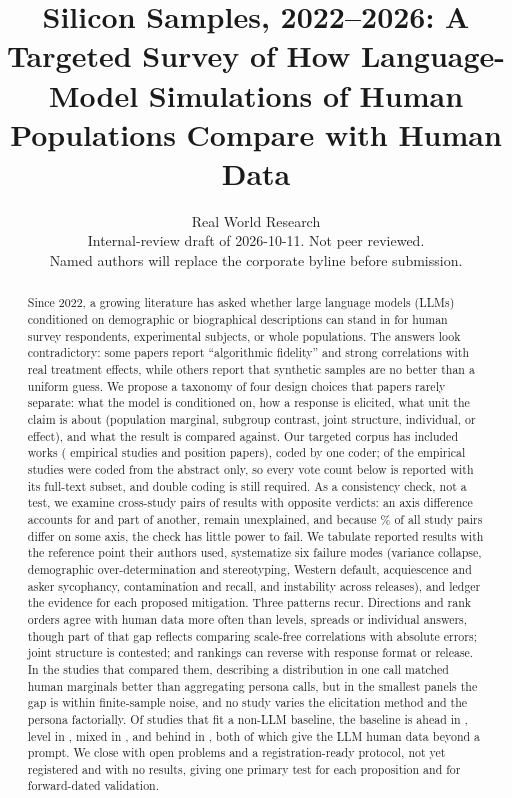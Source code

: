\documentclass[11pt]{article}
\title{Silicon Samples, 2022--2026: A Targeted Survey of How Language-Model Simulations of Human Populations Compare with Human Data}
\author{Real World Research\\\small Internal-review draft of 2026-10-11. Not peer reviewed.\\\small Named authors will replace the corporate byline before submission.}
\date{}
\begin{document}
\maketitle

\begin{abstract}
Since 2022, a growing literature has asked whether large language models (LLMs) conditioned on demographic or biographical descriptions can stand in for human survey respondents, experimental subjects, or whole populations. The answers look contradictory: some papers report ``algorithmic fidelity'' and strong correlations with real treatment effects, while others report that synthetic samples are no better than a uniform guess. We propose a taxonomy of four design choices that papers rarely separate: what the model is conditioned on, how a response is elicited, what unit the claim is about (population marginal, subgroup contrast, joint structure, individual, or effect), and what the result is compared against. Our targeted corpus has \cIncluded{} included works (\cEmp{} empirical studies and \cPos{} position papers), coded by one coder; \cEmpAbstract{} of the \cEmp{} empirical studies were coded from the abstract only, so every vote count below is reported with its full-text subset, and double coding is still required. As a consistency check, not a test, we examine \cConflicts{} cross-study pairs of results with opposite verdicts: an axis difference accounts for \cReconciled{} and part of another, \cUnexplained{} remain unexplained, and because \cBaseRatePct{}\% of all study pairs differ on some axis, the check has little power to fail. We tabulate reported results with the reference point their authors used, systematize six failure modes (variance collapse, demographic over-determination and stereotyping, Western default, acquiescence and asker sycophancy, contamination and recall, and instability across releases), and ledger the evidence for each proposed mitigation. Three patterns recur. Directions and rank orders agree with human data more often than levels, spreads or individual answers, though part of that gap reflects comparing scale-free correlations with absolute errors; joint structure is contested; and rankings can reverse with response format or release. In the studies that compared them, describing a distribution in one call matched human marginals better than aggregating persona calls, but in the smallest panels the gap is within finite-sample noise, and no study varies the elicitation method and the persona factorially. Of \cBase{} studies that fit a non-LLM baseline, the baseline is ahead in \cBaseAhead{}, level in \cBaseLevel{}, mixed in \cBaseMixed{}, and behind in \cBaseLLM{}, both of which give the LLM human data beyond a prompt. We close with open problems and a registration-ready protocol, not yet registered and with no results, giving one primary test for each proposition and for forward-dated validation.
\end{abstract}
\end{document}
